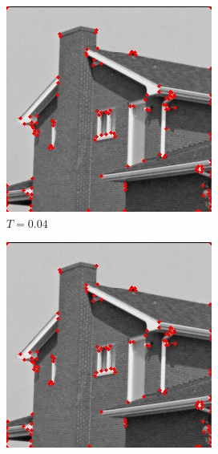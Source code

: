 \documentclass[10pt,a4paper,twoside]{article}
\newcommand{\sweepsize}{0.26}
\begin{document}
\begin{figure}[h]
    \begin{subfigure}{\sweepsize\textwidth}
    \includegraphics[width=0.9\linewidth, height=0.9\linewidth]{sweep_house/house_10_004_1e-05.jpg} 
    \caption{$T=0.04$}
    \end{subfigure}
    \begin{subfigure}{\sweepsize\textwidth}
    \includegraphics[width=0.9\linewidth, height=0.9\linewidth]{sweep_house/house_10_005_1e-05.jpg} 

\end{subfigure}
\end{figure}
\end{document}
